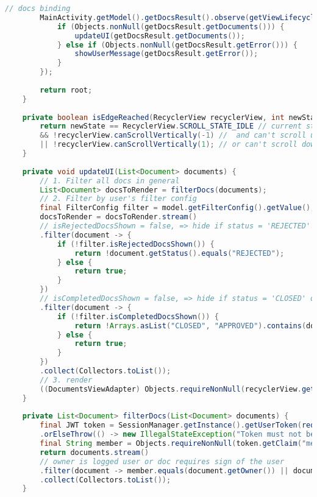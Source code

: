 \begin{lstlisting}[language=Java]
		// docs binding
		MainActivity.getModel().getDocsResult().observe(getViewLifecycleOwner(), getDocsResult -> {
			if (Objects.nonNull(getDocsResult.getDocuments())) {
				updateUI(getDocsResult.getDocuments());
			} else if (Objects.nonNull(getDocsResult.getError())) {
				showUserMessage(getDocsResult.getError());
			}
		});
		
		return root;
	}
	
	private boolean isEdgeReached(RecyclerView recyclerView, int newState) {
		return newState == RecyclerView.SCROLL_STATE_IDLE // current state is idle
		&& !recyclerView.canScrollVertically(-1) //  and can't scroll up
		|| !recyclerView.canScrollVertically(1); // or can't scroll down
	}
	
	private void updateUI(List<Document> documents) {
		// 1. Filter all docs in general
		List<Document> docsToRender = filterDocs(documents);
		// 2. Filter by user's filter config
		final FilterConfig filter = model.getFilterConfig().getValue();
		docsToRender = docsToRender.stream()
		// isRejectedDocsShown = false, => hide if status = 'REJECTED'
		.filter(document -> {
			if (!filter.isRejectedDocsShown()) {
				return !document.getStatus().equals("REJECTED");
			} else {
				return true;
			}
		})
		// isCompletedDocsShown = false, => hide if status = 'CLOSED' or 'APPROVED'
		.filter(document -> {
			if (!filter.isCompletedDocsShown()) {
				return !Arrays.asList("CLOSED", "APPROVED").contains(document.getStatus());
			} else {
				return true;
			}
		})
		.collect(Collectors.toList());
		// 3. render
		((DocumentsViewAdapter) Objects.requireNonNull(recyclerView.getAdapter())).setDocs(docsToRender);
	}
	
	private List<Document> filterDocs(List<Document> documents) {
		final JWT token = SessionManager.getInstance().getUserToken(requireContext())
		.orElseThrow(() -> new IllegalStateException("Token must not be null at this stage."));
		final String member = Objects.requireNonNull(token.getClaim("member")).asString();
		return documents.stream()
		// owner is logged user or doc requires sign of the user
		.filter(document -> member.equals(document.getOwner()) || document.getSignsRequired().contains(member))
		.collect(Collectors.toList());
	}
	

\end{lstlisting}
